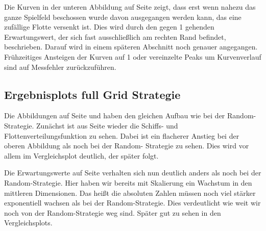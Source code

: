 \documentclass[a4paper,12pt]{llncs}
\numberwithin{equation}{section}
\begin{document}
Die Kurven in der unteren Abbildung auf Seite \pageref{fig:random1} zeigt, dass erst wenn nahezu das ganze Spielfeld beschossen wurde davon ausgegangen werden kann, das eine zufällige Flotte versenkt ist. Dies wird durch den gegen 1 gehenden Erwartungswert, der sich fast ausschließlich am rechten Rand befindet, beschrieben. Darauf wird in einem späteren Abschnitt noch genauer angegangen. Frühzeitiges Ansteigen der Kurven auf 1 oder vereinzelte Peaks um Kurvenverlauf sind auf Messfehler zurückzuführen.

\subsection{Ergebnisplots full Grid Strategie}

\begin{landscape}
	\label{fig:fullGrid1}
	
\end{landscape}

\begin{landscape}
	\label{fig:fullGrid2}
	
\end{landscape}


\begin{landscape}
	\label{fig:fullGrid3}
	
\end{landscape}


\begin{landscape}
	\label{fig:fullGrid4}
	
\end{landscape}

Die Abbildungen auf Seite \pageref{fig:fullGrid1} und \pageref{fig:fullGrid2} haben den gleichen Aufbau wie bei der Random-Strategie. Zunächst ist aus Seite \pageref{fig:fullGrid1} wieder die Schiffs- und Flottenverteilungsfunktion zu sehen. Dabei ist ein flacherer Anstieg bei der oberen Abbildung als noch bei der Random- Strategie zu sehen. Dies wird vor allem im Vergleichsplot deutlich, der später folgt. 

Die Erwartungswerte auf Seite \pageref{fig:fullGrid2} verhalten sich nun deutlich anders als noch bei der Random-Strategie. Hier haben wir bereits mit Skalierung ein Wachstum in den mittleren Dimensionen. Das heißt die absoluten Zahlen müssen noch viel stärker exponentiell wachsen als bei der Random-Strategie. Dies verdeutlicht wie weit wir noch von der Random-Strategie weg sind. Später gut zu sehen in den Vergleichsplots.
\end{document}
